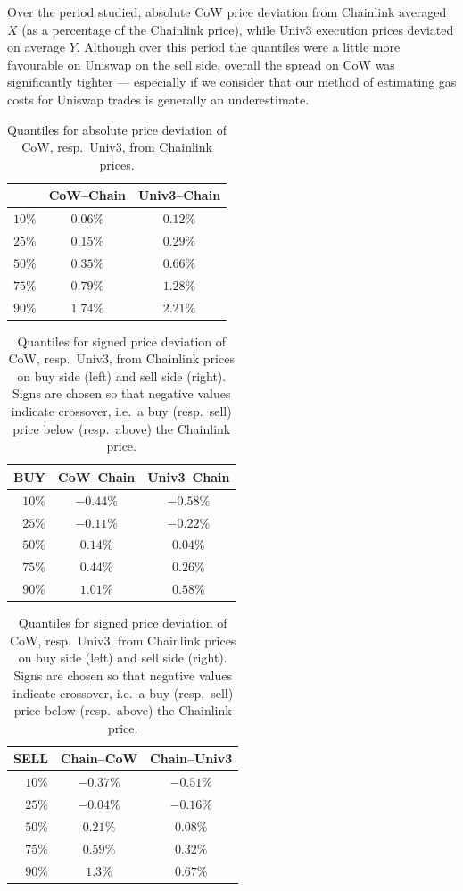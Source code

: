 \documentclass[a4paper,10pt]{article}
\theoremstyle{remark}
\begin{document}
Over the period studied, absolute CoW price deviation from Chainlink averaged $X$ (as a percentage of the Chainlink price), while Univ3 execution prices deviated on average $Y$.
%
Although over this period the quantiles were a little more favourable on Uniswap on the sell side, overall the spread on CoW was significantly tighter --- especially if we consider that our method of estimating gas costs for Uniswap trades is generally an underestimate.
%
\begin{table}
  \begin{center}
    \begin{tabular}{|r|c|c|}
      \hline 
      & CoW--Chain & Univ3--Chain \\
      \hline 
      $10\%$ & $0.06\%$ & $0.12\%$ \\
      $25\%$ & $0.15\%$ & $0.29\%$ \\
      $50\%$ & $0.35\%$ & $0.66\%$ \\
      $75\%$ & $0.79\%$ & $1.28\%$ \\
      $90\%$ & $1.74\%$ & $2.21\%$ \\ 
      \hline
    \end{tabular}
    \caption{Quantiles for absolute price deviation of CoW, resp.~Univ3, from Chainlink prices.}
  \end{center}
\end{table}
%
\begin{table}
  \begin{center}
    \begin{tabular}{|r|c|c|}
      \hline 
      BUY & CoW--Chain & Univ3--Chain \\
      \hline 
      $10\%$ & $-0.44\%$ & $-0.58\%$ \\
      $25\%$ & $-0.11\%$ & $-0.22\%$ \\
      $50\%$ & $0.14\%$ & $0.04\%$ \\
      $75\%$ & $0.44\%$ & $0.26\%$ \\
      $90\%$ & $1.01\%$ & $0.58\%$ \\ 
      \hline
    \end{tabular}
    \qquad
    \begin{tabular}{|r|c|c|}
      \hline 
      SELL & Chain--CoW & Chain--Univ3 \\
      \hline 
      $10\%$ & $-0.37\%$ & $-0.51\%$ \\
      $25\%$ & $-0.04\%$ & $-0.16\%$ \\
      $50\%$ & $0.21\%$ & $0.08\%$ \\
      $75\%$ & $0.59\%$ & $0.32\%$ \\
      $90\%$ & $1.3\%$ & $0.67\%$ \\ 
      \hline
    \end{tabular}
    \caption{Quantiles for signed price deviation of CoW, resp.~Univ3, from Chainlink prices on buy side (left) and sell side (right). Signs are chosen so that negative values indicate crossover, i.e.~a buy (resp.~sell) price below (resp.~above) the Chainlink price.}
  \end{center}
\end{table}
\end{document}

